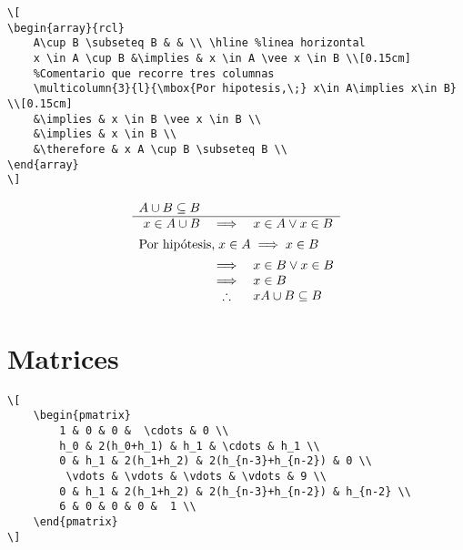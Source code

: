 \documentclass[a4,10pt]{aleph-notas}
\theoremstyle{definition}
\theoremstyle{plain}
\begin{document}
\begin{lstlisting}[frame=single]
\[
\begin{array}{rcl}
    A\cup B \subseteq B & & \\ \hline %linea horizontal
    x \in A \cup B &\implies & x \in A \vee x \in B \\[0.15cm]
    %Comentario que recorre tres columnas
    \multicolumn{3}{l}{\mbox{Por hipotesis,\;} x\in A\implies x\in B} \\[0.15cm]
    &\implies & x \in B \vee x \in B \\
    &\implies & x \in B \\
    &\therefore & x A \cup B \subseteq B \\
\end{array}
\]
\end{lstlisting}

\[
    \begin{array}{rcl}
        A\cup B \subseteq B & & \\ \hline %
        x \in A \cup B &\implies & x \in A \vee x \in B \\[0.15cm]
        \multicolumn{3}{l}{\mbox{Por hipótesis,\;} x\in A\implies x\in B} \\[0.15cm]
        &\implies & x \in B \vee x \in B \\
        &\implies & x \in B \\
        &\therefore & x A \cup B \subseteq B \\
    \end{array}
\]

\section{Matrices}

\begin{lstlisting}[frame=single]
\[
    \begin{pmatrix}
        1 & 0 & 0 &  \cdots & 0 \\
        h_0 & 2(h_0+h_1) & h_1 & \cdots & h_1 \\
        0 & h_1 & 2(h_1+h_2) & 2(h_{n-3}+h_{n-2}) & 0 \\
         \vdots & \vdots & \vdots & \vdots & 9 \\
        0 & h_1 & 2(h_1+h_2) & 2(h_{n-3}+h_{n-2}) & h_{n-2} \\
        6 & 0 & 0 & 0 &  1 \\
    \end{pmatrix}
\]
\end{lstlisting}
\end{document}
